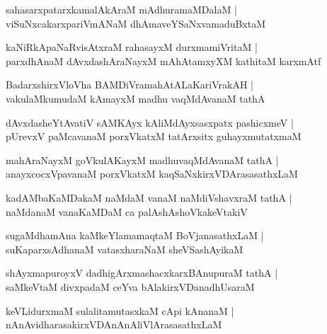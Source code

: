 \documentclass[twoside,12pt,openright]{book}
\newcounter{shloka}[chapter]
\begin{document}
\begin{shloka}%
sahasarxpatarxkamalAkAraM mAdhuramaMDalaM |\\
viSuNxcakarxpariVmANaM dhAmaveYSaNxvamaduBxtaM 
\end{shloka}

\begin{shloka}%
kaNiRkApaNaRvisAtxraM rahasayxM durxmamiVritaM |\\
parxdhAnaM dAvxdashAraNayxM mAhAtamxyXM kathitaM karxmAtf
\end{shloka}

\begin{shloka}%
BadarxshirxVloVha BAMDiVramahAtALaKariVrakAH |\\
vakulaMkumudaM kAmayxM madhu vaqMdAvanaM tathA 
\end{shloka}

\begin{shloka}%
dAvxdasheYtAvatiV sAMKAyx kAliMdAyxsasxpatx pashicxmeV |\\
pUrevxV paMcavanaM porxVkatxM tatArxsitx guhayxmutatxmaM 
\end{shloka}

\begin{shloka}%
mahAraNayxM goVkulAKayxM madhuvaqMdAvanaM tathA |\\
anayxcocxVpavanaM porxVkatxM kaqSaNxkirxVDArasasathxLaM 
\end{shloka}

\begin{shloka}%
kadAMbaKaMDakaM naMdaM vanaM naMdiVshavxraM tathA |\\
naMdanaM vanaKaMDaM ca palAshAshoVkakeVtakiV
\end{shloka}

\begin{shloka}%
sugaMdhamAna kaMkeYlamamaqtaM  BoVjanasathxLaM |\\
suKaparxsAdhanaM vatasxharaNaM sheVSashAyikaM 
\end{shloka}

\begin{shloka}%
shAyxmapuroyxV dadhigArxmashacxkarxBAnupuraM tathA |\\
saMkeVtaM divxpadaM ceYva bAlakirxVDanadhUsaraM 
\end{shloka}

\begin{shloka}%
keVLidurxmaM sulalitamutasxkaM cApi kAnanaM |\\
nAnAvidharasakirxVDAnAnAliVlArasasathxLaM 
\end{shloka}
\end{document}
